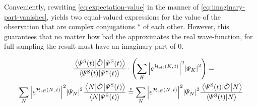 Conveniently, rewriting \autoref{eq:expectation-value} in the manner of \autoref{eq:imaginary-part-vanishes}, yields two equal-valued expressions for the value of the observation that are complex conjugations $\ast$ of each other.
However, this guarantees that no matter how \glqq bad\grqq{} the \psiOfT[\schroedingerPicture] approximates the real wave-function, for full sampling the result must have an imaginary part of 0.

\begin{equation}
    \label{eq:imaginary-part-vanishes}
    \begin{split}
        \frac{\bracketHelper{\psiOfT[\schroedingerPicture]}{\ObservableOp}{\psiOfT[\schroedingerPicture]}}{\braketHelper{\psiOfT[\schroedingerPicture]}{\psiOfT[\schroedingerPicture]}}
        &\cdot
        \left(
            \lsum[K] \absSquare{e^{\HeffOft[K]}} \absSquare{\psiN[K]} 
        \right) =\\
        \lsum[N]
        \absSquare{e^{\HeffOft}} \absSquare{\psiN} 
        \frac{\bracketHelper{N}{\ObservableOp}{\psiOfT[\schroedingerPicture]}}{\braketHelper{N}{\psiOfT[\schroedingerPicture]}}
        &\stackrel{\ast}{=}
        \lsum[N]
        \absSquare{e^{\HeffOft}} \absSquare{\psiN} 
        \frac{\bracketHelper{\psiOfT[\schroedingerPicture]}{\ObservableOp}{N}}{\braketHelper{\psiOfT[\schroedingerPicture]}{N}}
    \end{split}
\end{equation}